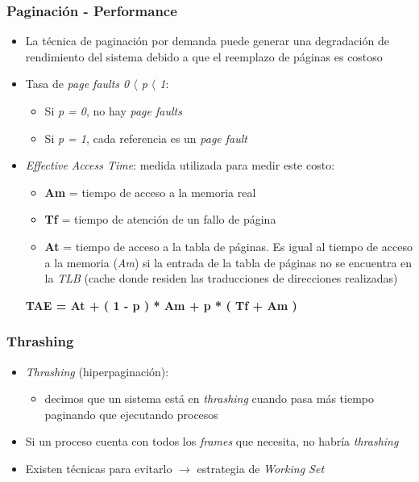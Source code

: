 \begin{frame}
  \frametitle{Paginación - \textbf{Performance}}
  \begin{itemize}
  	\item La técnica de paginación por demanda puede generar una degradación de rendimiento del sistema debido a que el reemplazo de páginas es costoso
  	\item Tasa de \emph{page faults 0 $\langle$ p $\langle$ 1}:
  	\begin{itemize}
  		\item Si \emph{p = 0}, no hay \emph{page faults}
		\item Si \emph{p = 1}, cada referencia es un \emph{page fault}
  	\end{itemize}
  	\item \emph{Effective Access Time}: medida utilizada para medir este costo:
  	\begin{itemize}
  		\item \textbf{Am} = tiempo de acceso a la memoria real
  		\item \textbf{Tf} = tiempo de atención de un fallo de página
  		\item \textbf{At} = tiempo de acceso a la tabla de páginas. Es igual al tiempo de acceso a la memoria (\emph{Am}) si la entrada de la tabla de páginas no se encuentra en la \emph{TLB} (cache donde residen las traducciones de direcciones realizadas)
  	\end{itemize}
  	\hspace{35pt} \textbf{TAE = At + ( 1 - p ) * Am + p * ( Tf + Am )}
  \end{itemize}
\end{frame}

\begin{frame}
  \frametitle{\textbf{Thrashing}}
  \begin{itemize}
  	\item \emph{Thrashing} (hiperpaginación):
  	\begin{itemize}
  		\item decimos que un sistema está en \emph{thrashing} cuando pasa más tiempo paginando que ejecutando procesos
  	\end{itemize}
  	\item Si un proceso cuenta con todos los \emph{frames}
  	que necesita, no habría \emph{thrashing}
  	\item Existen técnicas para evitarlo $\rightarrow$ estrategia de \emph{Working Set}
  \end{itemize}
\end{frame}

